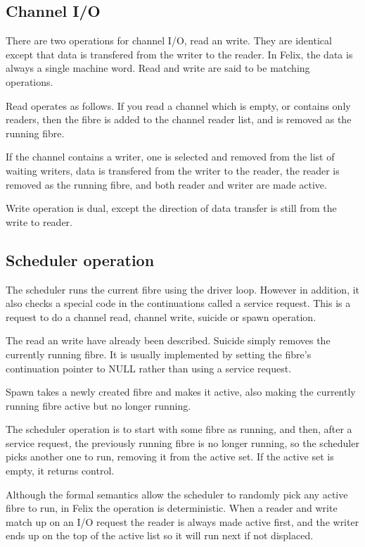 \documentclass[oneside]{book}
\begin{document}
\subsection{Channel I/O}
There are two operations for channel I/O, read an write.
They are identical except that data is transfered from the writer
to the reader. In Felix, the data is always a single machine word.
Read and write are said to be matching operations.

Read operates as follows. If you read a channel which is empty,
or contains only readers, then the fibre is added to the channel
reader list, and is removed as the running fibre.

If the channel contains a writer, one is selected and removed
from the list of waiting writers, data is transfered from the writer
to the reader, the reader is removed as the running fibre, and both
reader and writer are made active.

Write operation is dual, except the direction of data transfer
is still from the write to reader.

\subsection{Scheduler operation}
The scheduler runs the current fibre using the driver loop.
However in addition, it also checks a special code in the continuations
called a service request. This is a request to do a channel read, channel
write, suicide or spawn operation.

The read an write have already been described. Suicide simply removes the
currently running fibre. It is usually implemented by setting the fibre's
continuation pointer to NULL rather than using a service request.

Spawn takes a newly created fibre and makes it active, also making
the currently running fibre active but no longer running.

The scheduler operation is to start with some fibre as running,
and then, after a service request, the previously running fibre
is no longer running, so the scheduler picks another one to run,
removing it from the active set. If the active set is empty,
it returns control.

Although the formal semantics allow the scheduler to randomly pick
any active fibre to run, in Felix the operation is deterministic.
When a reader and write match up on an I/O request the reader is
always made active first, and the writer ends up on the top
of the active list so it will run next if not displaced.
\end{document}
